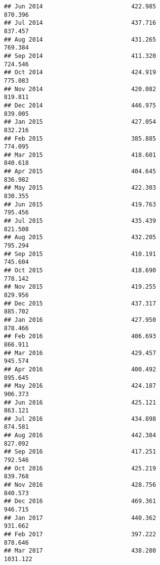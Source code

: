 \documentclass[
]{article}
\begin{document}
\begin{verbatim}
## Jun 2014                         422.985                           870.396
## Jul 2014                         437.716                           837.457
## Aug 2014                         431.265                           769.384
## Sep 2014                         411.320                           724.546
## Oct 2014                         424.919                           775.083
## Nov 2014                         420.082                           819.811
## Dec 2014                         446.975                           839.005
## Jan 2015                         427.054                           832.216
## Feb 2015                         385.885                           774.095
## Mar 2015                         418.601                           840.618
## Apr 2015                         404.645                           836.982
## May 2015                         422.303                           830.355
## Jun 2015                         419.763                           795.456
## Jul 2015                         435.439                           821.508
## Aug 2015                         432.205                           795.294
## Sep 2015                         410.191                           745.604
## Oct 2015                         418.690                           778.142
## Nov 2015                         419.255                           829.956
## Dec 2015                         437.317                           885.702
## Jan 2016                         427.950                           878.466
## Feb 2016                         406.693                           866.911
## Mar 2016                         429.457                           945.574
## Apr 2016                         400.492                           895.645
## May 2016                         424.187                           906.373
## Jun 2016                         425.121                           863.121
## Jul 2016                         434.898                           874.581
## Aug 2016                         442.384                           827.092
## Sep 2016                         417.251                           792.546
## Oct 2016                         425.219                           839.768
## Nov 2016                         428.756                           840.573
## Dec 2016                         469.361                           946.715
## Jan 2017                         440.362                           931.662
## Feb 2017                         397.222                           878.646
## Mar 2017                         438.280                          1031.122

\end{verbatim}
\end{document}
